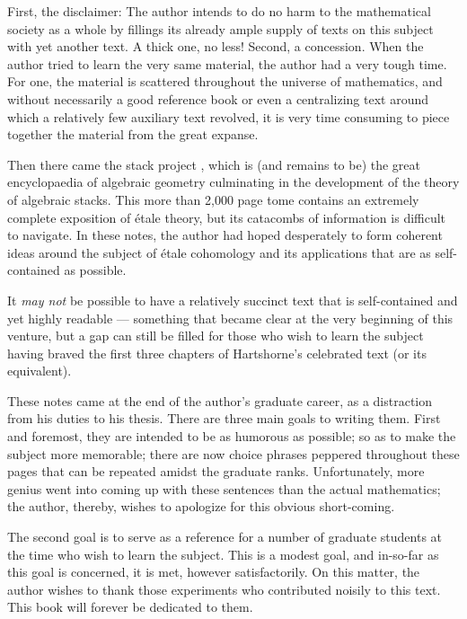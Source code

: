 \Preface

First, the disclaimer: The author intends to do no harm to the
mathematical society as a whole by fillings its already ample
supply of texts on this subject with yet another text. A thick
one, no less! Second, a concession. When the author tried to
learn the very same material, the author had a very tough time.
For one, the material is scattered throughout the universe of
mathematics, and without necessarily a good reference book or
even a centralizing text around which a relatively few auxiliary
text revolved, it is very time consuming to piece together the 
material from the great expanse.

Then there came the stack project \cite{Stack}, which is (and 
remains to be) the great encyclopaedia of algebraic geometry 
culminating in the development of the theory of algebraic stacks. 
This more than 2,000 page tome contains an extremely complete 
exposition of \'etale theory, but its catacombs of information is 
difficult to navigate. In these notes, the author had hoped 
desperately to form coherent ideas around the subject of \'etale 
cohomology and its applications that are as self-contained as 
possible.

It \emph{may not} be possible to have a relatively succinct text 
that is self-contained and yet highly readable --- something that 
became clear at the very beginning of this venture, but a gap can 
still be filled for those who wish to learn the subject having 
braved the first three chapters of Hartshorne's celebrated text 
(or its equivalent).

These notes came at the end of the author's graduate career,
as a distraction from his duties to his thesis. There are three
main goals to writing them. First and foremost, they are intended
to be as humorous as possible; so as to make the subject more
memorable; there are now choice phrases peppered throughout 
these pages that can be repeated amidst the graduate ranks. 
Unfortunately, more genius went into coming up with these 
sentences than the actual mathematics; the author, thereby, wishes 
to apologize for this obvious short-coming.

The second goal is to serve as a reference for a number of 
graduate students at the time who wish to learn the subject. This
is a modest goal, and in-so-far as this goal is concerned, it
is met, however satisfactorily. On this matter, the author wishes
to thank those experiments who contributed noisily to this
text. This book will forever be dedicated to them.

